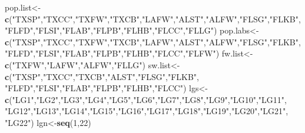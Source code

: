 \documentclass[]{article}
\newenvironment{Shaded}{\begin{snugshade}}{\end{snugshade}}
\newcommand{\KeywordTok}[1]{\textcolor[rgb]{0.13,0.29,0.53}{\textbf{#1}}}
\newcommand{\DecValTok}[1]{\textcolor[rgb]{0.00,0.00,0.81}{#1}}
\newcommand{\StringTok}[1]{\textcolor[rgb]{0.31,0.60,0.02}{#1}}
\newcommand{\NormalTok}[1]{#1}
\begin{document}
\begin{Shaded}
\begin{Highlighting}[]
\NormalTok{pop.list<-}\KeywordTok{c}\NormalTok{(}\StringTok{"TXSP"}\NormalTok{,}\StringTok{"TXCC"}\NormalTok{,}\StringTok{"TXFW"}\NormalTok{,}\StringTok{"TXCB"}\NormalTok{,}\StringTok{"LAFW"}\NormalTok{,}\StringTok{"ALST"}\NormalTok{,}\StringTok{"ALFW"}\NormalTok{,}\StringTok{"FLSG"}\NormalTok{,}\StringTok{"FLKB"}\NormalTok{,}
    \StringTok{"FLFD"}\NormalTok{,}\StringTok{"FLSI"}\NormalTok{,}\StringTok{"FLAB"}\NormalTok{,}\StringTok{"FLPB"}\NormalTok{,}\StringTok{"FLHB"}\NormalTok{,}\StringTok{"FLCC"}\NormalTok{,}\StringTok{"FLLG"}\NormalTok{)}
\NormalTok{pop.labs<-}\KeywordTok{c}\NormalTok{(}\StringTok{"TXSP"}\NormalTok{,}\StringTok{"TXCC"}\NormalTok{,}\StringTok{"TXFW"}\NormalTok{,}\StringTok{"TXCB"}\NormalTok{,}\StringTok{"LAFW"}\NormalTok{,}\StringTok{"ALST"}\NormalTok{,}\StringTok{"ALFW"}\NormalTok{,}\StringTok{"FLSG"}\NormalTok{,}\StringTok{"FLKB"}\NormalTok{,}
            \StringTok{"FLFD"}\NormalTok{,}\StringTok{"FLSI"}\NormalTok{,}\StringTok{"FLAB"}\NormalTok{,}\StringTok{"FLPB"}\NormalTok{,}\StringTok{"FLHB"}\NormalTok{,}\StringTok{"FLCC"}\NormalTok{,}\StringTok{"FLFW"}\NormalTok{)}
\NormalTok{fw.list<-}\KeywordTok{c}\NormalTok{(}\StringTok{"TXFW"}\NormalTok{,}\StringTok{"LAFW"}\NormalTok{,}\StringTok{"ALFW"}\NormalTok{,}\StringTok{"FLLG"}\NormalTok{)}
\NormalTok{sw.list<-}\KeywordTok{c}\NormalTok{(}\StringTok{"TXSP"}\NormalTok{,}\StringTok{"TXCC"}\NormalTok{,}\StringTok{"TXCB"}\NormalTok{,}\StringTok{"ALST"}\NormalTok{,}\StringTok{"FLSG"}\NormalTok{,}\StringTok{"FLKB"}\NormalTok{,}
    \StringTok{"FLFD"}\NormalTok{,}\StringTok{"FLSI"}\NormalTok{,}\StringTok{"FLAB"}\NormalTok{,}\StringTok{"FLPB"}\NormalTok{,}\StringTok{"FLHB"}\NormalTok{,}\StringTok{"FLCC"}\NormalTok{)}
\NormalTok{lgs<-}\KeywordTok{c}\NormalTok{(}\StringTok{"LG1"}\NormalTok{,}\StringTok{"LG2"}\NormalTok{,}\StringTok{"LG3"}\NormalTok{,}\StringTok{"LG4"}\NormalTok{,}\StringTok{"LG5"}\NormalTok{,}\StringTok{"LG6"}\NormalTok{,}\StringTok{"LG7"}\NormalTok{,}\StringTok{"LG8"}\NormalTok{,}\StringTok{"LG9"}\NormalTok{,}\StringTok{"LG10"}\NormalTok{,}\StringTok{"LG11"}\NormalTok{,}
    \StringTok{"LG12"}\NormalTok{,}\StringTok{"LG13"}\NormalTok{,}\StringTok{"LG14"}\NormalTok{,}\StringTok{"LG15"}\NormalTok{,}\StringTok{"LG16"}\NormalTok{,}\StringTok{"LG17"}\NormalTok{,}\StringTok{"LG18"}\NormalTok{,}\StringTok{"LG19"}\NormalTok{,}\StringTok{"LG20"}\NormalTok{,}\StringTok{"LG21"}\NormalTok{,}
    \StringTok{"LG22"}\NormalTok{)}
\NormalTok{lgn<-}\KeywordTok{seq}\NormalTok{(}\DecValTok{1}\NormalTok{,}\DecValTok{22}\NormalTok{)}

\end{Highlighting}
\end{Shaded}
\end{document}
